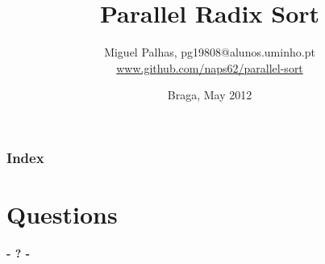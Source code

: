 \documentclass{beamer}
\title{Parallel Radix Sort}
\author{Miguel Palhas, pg19808@alunos.uminho.pt \\
	\footnotesize{\url{www.github.com/naps62/parallel-sort}}}
\institute[19808]{
	University of Minho\\
	Department of Informatics
}
\date{Braga, May 2012}
\begin{document}

\maketitle

\begin{frame}
	\frametitle{Index}
	\tableofcontents
\end{frame}



\section{Questions}
\begin{frame}
	\titlepage
	\begin{center}
		\Huge\bfseries
		- ? -
	\end{center}
\end{frame}
\end{document}
